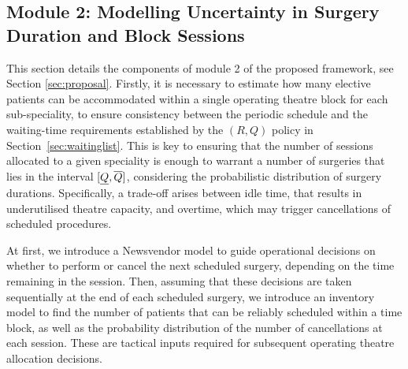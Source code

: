 \subsection{Module 2: Modelling Uncertainty in Surgery Duration and Block Sessions} \label{sec:module2}

This section details the components of module 2 of the proposed framework, see Section \ref{sec:proposal}. Firstly, it is necessary to estimate how many elective patients can be accommodated within a single operating theatre block for each sub-speciality, to ensure consistency between the periodic schedule and the waiting-time requirements established by the $(R,Q)$ policy in Section~\ref{sec:waitinglist}. This is key to ensuring that the number of sessions allocated to a given speciality is enough to warrant a number of surgeries that lies in the interval $[\underline{Q}, \overline{Q}]$, considering the probabilistic distribution of surgery durations. Specifically, a trade-off arises between idle time, that results in underutilised theatre capacity, and overtime, which may trigger cancellations of scheduled procedures. 



At first, we introduce a Newsvendor model to guide operational decisions on whether to perform or cancel the next scheduled surgery, depending on the time remaining in the session. Then, assuming that these decisions are taken sequentially at the end of each scheduled surgery, we introduce an inventory model to find the number of patients that can be reliably scheduled within a time block, as well as the probability distribution of the number of cancellations at each session. These are tactical inputs required for subsequent operating theatre allocation decisions.

